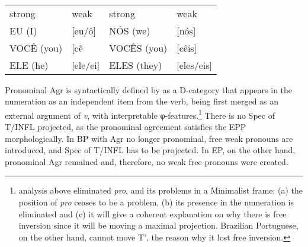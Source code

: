 \documentclass[output=paper]{langsci/langscibook}
\begin{document}
\ea\label{ex:26.17}\leavevmode\\[-1\baselineskip]
    \begin{tabular}{llll}
    strong     & weak     & strong      & weak \\
    EU (I)     & [eu/ô]   & NÓS (we)    & [nós] \\
    VOCÊ (you) & [cê      & VOCÊS (you) & [cêis] \\
    ELE (he)   & [ele/ei] & ELES (they) & [eles/eis] \\
    \end{tabular}
\z\largerpage

Pronominal Agr is syntactically defined by \citet{Kato1999} as a D-category
that appears in the numeration as an independent item from the verb, being
first merged as an external argument of \emph{v}, with interpretable
φ-features.\footnote{ analysis above eliminated \emph{pro},
    and its problems in a Minimalist frame: (a) the position of \emph{pro}
    ceases to be a problem, (b) its presence in the numeration is eliminated
    and (c) it will give a coherent explanation on why there is free inversion
    since it will be moving a maximal projection. Brazilian Portuguese, on the
other hand, cannot move T’, the reason why it lost free inversion.}  There is
no Spec of T/INFL projected, as the pronominal agreement satisfies the
\gls{EPP} morphologically. In \gls{BP}
with Agr no longer pronominal, free weak pronouns are introduced, and Spec of
T/INFL has to be projected. In \gls{EP}, on the other
hand, pronominal Agr remained and, therefore, no weak free pronouns were
created.
\end{document}
